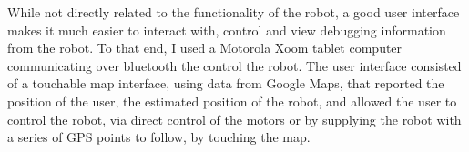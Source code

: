 
While not directly related to the functionality of the robot, a good user interface makes it much easier to interact with, control and view debugging information from the robot. To that end, I used a Motorola Xoom tablet computer communicating over bluetooth the control the robot. The user interface consisted of a touchable map interface, using data from Google Maps, that reported the position of the user, the estimated position of the robot, and allowed the user to control the robot, via direct control of the motors or by supplying the robot with a series of GPS points to follow, by touching the map.

